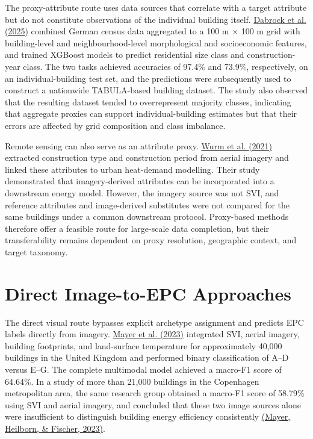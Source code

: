 The proxy-attribute route uses data sources that correlate with a target attribute but do not constitute observations of the individual building itself. \hyperlink{ref:dabrock2025}{Dabrock et al. (2025)} combined German census data aggregated to a 100 m \ensuremath{\times} 100 m grid with building-level and neighbourhood-level morphological and socioeconomic features, and trained XGBoost models to predict residential size class and construction-year class. The two tasks achieved accuracies of 97.4\% and 73.9\%, respectively, on an individual-building test set, and the predictions were subsequently used to construct a nationwide TABULA-based building dataset. The study also observed that the resulting dataset tended to overrepresent majority classes, indicating that aggregate proxies can support individual-building estimates but that their errors are affected by grid composition and class imbalance.


Remote sensing can also serve as an attribute proxy. \hyperlink{ref:wurm2021}{Wurm et al. (2021)} extracted construction type and construction period from aerial imagery and linked these attributes to urban heat-demand modelling. Their study demonstrated that imagery-derived attributes can be incorporated into a downstream energy model. However, the imagery source was not SVI, and reference attributes and image-derived substitutes were not compared for the same buildings under a common downstream protocol. Proxy-based methods therefore offer a feasible route for large-scale data completion, but their transferability remains dependent on proxy resolution, geographic context, and target taxonomy.


\section{Direct Image-to-EPC Approaches}
\label{sec:2_4}


The direct visual route bypasses explicit archetype assignment and predicts EPC labels directly from imagery. \hyperlink{ref:mayer2023uk}{Mayer et al. (2023)} integrated SVI, aerial imagery, building footprints, and land-surface temperature for approximately 40,000 buildings in the United Kingdom and performed binary classification of A--D versus E--G. The complete multimodal model achieved a macro-F1 score of 64.64\%. In a study of more than 21,000 buildings in the Copenhagen metropolitan area, the same research group obtained a macro-F1 score of 58.79\% using SVI and aerial imagery, and concluded that these two image sources alone were insufficient to distinguish building energy efficiency consistently \hyperlink{ref:mayer2023dk}{(Mayer, Heilborn, \& Fischer, 2023)}.


